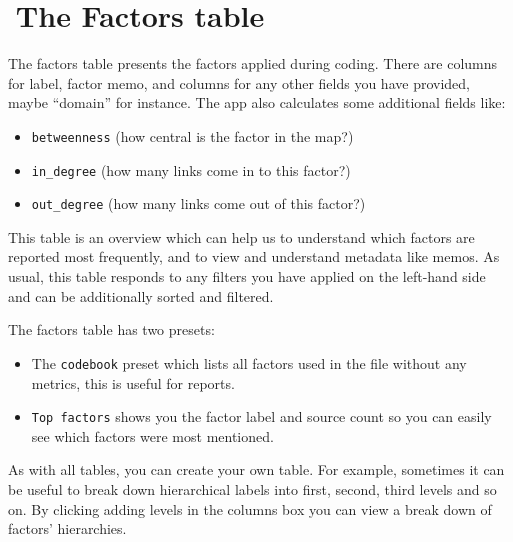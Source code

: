 \documentclass[
]{book}
\providecommand{\tightlist}{%
  \setlength{\itemsep}{0pt}\setlength{\parskip}{0pt}}
\begin{document}
\hypertarget{xthe-factors-table}{%
\chapter{🧪The Factors table}\label{xthe-factors-table}}

The factors table presents the factors applied during coding. There are columns for label, factor memo, and columns for any other fields you have provided, maybe ``domain'' for instance. The app also calculates some additional fields like:

\begin{itemize}
\tightlist
\item
  \texttt{betweenness} (how central is the factor in the map?)
\item
  \texttt{in\_degree} (how many links come in to this factor?)
\item
  \texttt{out\_degree} (how many links come out of this factor?)
\end{itemize}

This table is an overview which can help us to understand which factors are reported most frequently, and to view and understand metadata like memos. As usual, this table responds to any filters you have applied on the left-hand side and can be additionally sorted and filtered.

The factors table has two presets:

\begin{itemize}
\tightlist
\item
  The \texttt{codebook} preset which lists all factors used in the file without any metrics, this is useful for reports.
\item
  \texttt{Top\ factors} shows you the factor label and source count so you can easily see which factors were most mentioned.
\end{itemize}

As with all tables, you can create your own table. For example, sometimes it can be useful to break down hierarchical labels into first, second, third levels and so on. By clicking adding levels in the columns box you can view a break down of factors' hierarchies.
\end{document}
